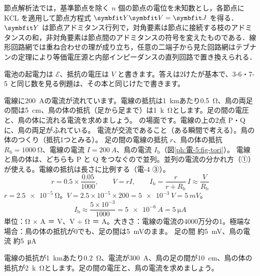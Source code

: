 \begin{senmonsho}[電気回路の本の書き方]
\begin{bkhonbun}
節点解析法では，基準節点を除く $n$ 個の節点の電位を未知数とし，各節点に KCL を適用して節点方程式 $\symbfit Y\symbfit V=\symbfit J$ を得る．$\symbfit Y$ は節点アドミタンス行列で，対角要素は節点に接続する枝のアドミタンスの和，非対角要素は節点間のアドミタンスの符号を変えたものである．線形回路網では重ね合わせの理が成り立ち，任意の二端子から見た回路網はテブナンの定理により等価電圧源と内部インピーダンスの直列回路で置き換えられる．
\end{bkhonbun}
\end{senmonsho}


\noindent 電池の起電力は $\mathcal E$、抵抗の電圧は $V$ と書きます。答えは2けたが基本で、3-6・7-5 と同じ数を見る例題は、その本と同じけたで書きます。

\begin{phreidai}[電線にとまった鳥]
\label{ph:電-5:ex1}電線に\qty{200}{A}の電流が流れています。電線の抵抗は\qty{1}{km}あたり\qty{0.5}{\ohm}、鳥の両足の間は\qty{5}{cm}、鳥の体の抵抗（足から足まで）は\qty{1}{k\ohm}とします。足の間の電圧と、鳥の体に流れる電流を求めましょう。
\phbamen
\bkhatenaref の場面です。電線の上の2点 P・Q に、鳥の両足がふれている。
\phmushi
電流が交流であること（ある瞬間で考える）。鳥の体のつくり（抵抗1つとみる）。
\phzu
足の間の電線の抵抗 $r$、鳥の体の抵抗 $R_{\mathrm b}=\qty{1000}{\ohm}$、電線の電流 $I=\qty{200}{A}$、鳥の電流 $I_{\mathrm b}$（図\ref{ph:電-5:fig-tori}）。
\phriyu
電線と鳥の体は、どちらも P と Q をつなぐので並列。並列の電流の分かれ方（①）が使える。電線の抵抗は長さに比例する（電-4 ③）。
\phtateru
\[ r=0.5\times\frac{0.05}{1000},\qquad V=rI,\qquad I_{\mathrm b}=\frac{r}{r+R_{\mathrm b}}\,I\approx\frac{V}{R_{\mathrm b}} \]
\phtoku
$r=\qty{2.5e-5}{\ohm}$。$V=2.5\times10^{-5}\times200=\qty{5e-3}{V}=\qty{5}{mV}$。
\[ I_{\mathrm b}\approx\frac{5\times10^{-3}}{1000}=\qty{5e-6}{A}=\qty{5}{\micro A} \]
\phtashikame
単位：Ω × A ＝ V、V ÷ Ω ＝ A。大きさ：電線の電流の4000万分の1。極端な場合：鳥の体の抵抗が0でも、足の間は\qty{5}{mV}のまま。
\kotae 足の間 約\qty{5}{mV}、鳥の電流 約\qty{5}{\micro A}
\end{phreidai}
\begin{jibun}
電線の抵抗が\qty{1}{km}あたり\qty{0.2}{\ohm}、電流が\qty{300}{A}、鳥の足の間が\qty{10}{cm}、鳥の体の抵抗が\qty{2}{k\ohm}とします。足の間の電圧と、鳥の電流を求めましょう。
\end{jibun}

